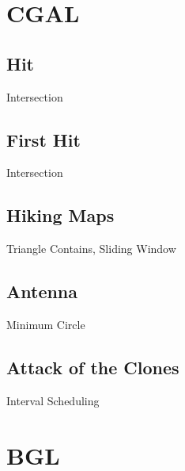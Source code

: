 \documentclass[10pt,a4paper,twoside]{report}
\begin{document}
\newpage
\section{CGAL}

\subsection*{Hit}
\begin{keywords}Intersection\end{keywords}


\newpage
\subsection*{First Hit}
\begin{keywords}Intersection\end{keywords}


\newpage
\subsection*{Hiking Maps}
\begin{keywords}Triangle Contains, Sliding Window\end{keywords}


\newpage
\subsection*{Antenna}
\begin{keywords}Minimum Circle\end{keywords}


\newpage
\subsection*{Attack of the Clones}
\begin{keywords}Interval Scheduling\end{keywords}



\newpage
\section{BGL}
\end{document}
